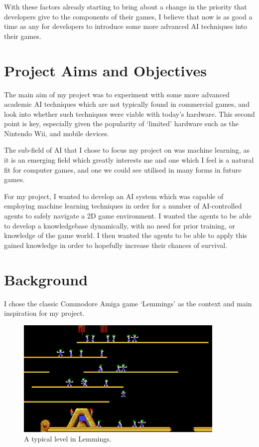 \documentclass[a4paper,oneside]{report}
\begin{document}
With these factors already starting to bring about a change in the priority that developers give to the components of their games, I believe that now is as good a time as any for developers to introduce some more advanced AI techniques into their games.

\section{Project Aims and Objectives}

The main aim of my project was to experiment with some more advanced academic AI techniques which are not typically found in commercial games, and look into whether such techniques were viable with today's hardware. This second point is key, especially given the popularity of `limited' hardware such as the Nintendo Wii, and mobile devices.

The sub-field of AI that I chose to focus my project on was machine learning, as it is an emerging field which greatly interests me and one which I feel is a natural fit for computer games, and one we could see utilised in many forms in future games.

For my project, I wanted to develop an AI system which was capable of employing machine learning techniques in order for a number of AI-controlled agents to safely navigate a 2D game environment. I wanted the agents to be able to develop a knowledgebase dynamically, with no need for prior training, or knowledge of the game world. I then wanted the agents to be able to apply this gained knowledge in order to hopefully increase their chances of survival. 

\section{Background}

I chose the classic Commodore Amiga game `Lemmings' as the context and main inspiration for my project.

\begin{figure}[h!]
  \centering
    \includegraphics[width=100mm]{sources/images/lemmings3}
    \caption{A typical level in Lemmings.\label{screen}}
\end{figure}
\end{document}
